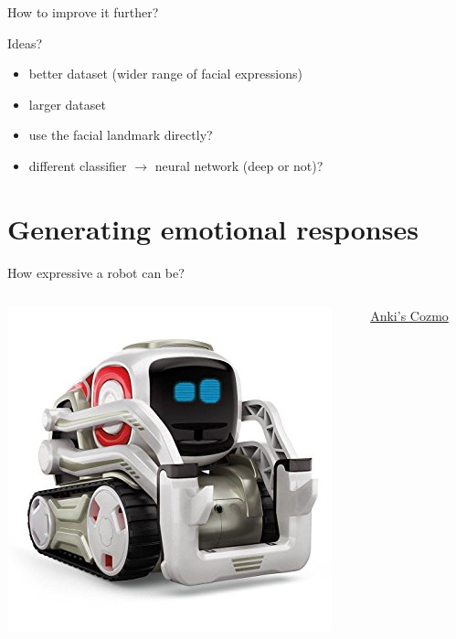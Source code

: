 \documentclass[compress]{beamer}
\begin{document}
\begin{frame}{How to improve it further?}

    \begin{center}
        Ideas?
    \end{center}

    \begin{itemize}
        \item better dataset (wider range of facial expressions)
        \item larger dataset
        \item use the facial landmark directly?
        \item different classifier $\rightarrow$ neural network (deep or not)?
    \end{itemize}

\end{frame}


\section{Generating emotional responses}


\begin{frame}{How expressive a robot can be?}

    \begin{columns}
        \begin{column}{0.5\linewidth}
            \begin{center}
                \includegraphics[width=0.8\linewidth]{cozmo}
            \end{center}
        \end{column}
        \begin{column}{0.5\linewidth}
            \href{https://www.anki.com/en-gb/cozmo}{Anki's Cozmo}
        \end{column}
    \end{columns}
\end{frame}
\end{document}
